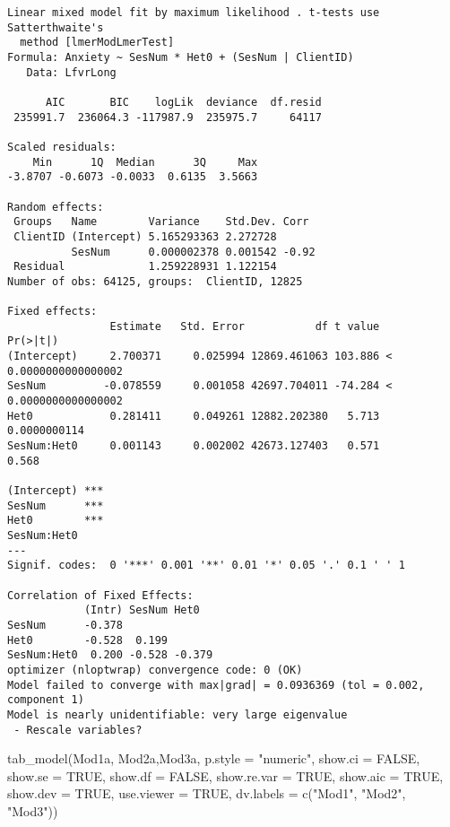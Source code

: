\documentclass[
  11pt,
]{book}
\newenvironment{Shaded}{\begin{snugshade}}{\end{snugshade}}
\newcommand{\AttributeTok}[1]{\textcolor[rgb]{0.77,0.63,0.00}{#1}}
\newcommand{\ConstantTok}[1]{\textcolor[rgb]{0.00,0.00,0.00}{#1}}
\newcommand{\FunctionTok}[1]{\textcolor[rgb]{0.00,0.00,0.00}{#1}}
\newcommand{\NormalTok}[1]{#1}
\newcommand{\StringTok}[1]{\textcolor[rgb]{0.31,0.60,0.02}{#1}}
\begin{document}
\begin{verbatim}
Linear mixed model fit by maximum likelihood . t-tests use Satterthwaite's
  method [lmerModLmerTest]
Formula: Anxiety ~ SesNum * Het0 + (SesNum | ClientID)
   Data: LfvrLong

      AIC       BIC    logLik  deviance  df.resid 
 235991.7  236064.3 -117987.9  235975.7     64117 

Scaled residuals: 
    Min      1Q  Median      3Q     Max 
-3.8707 -0.6073 -0.0033  0.6135  3.5663 

Random effects:
 Groups   Name        Variance    Std.Dev. Corr 
 ClientID (Intercept) 5.165293363 2.272728      
          SesNum      0.000002378 0.001542 -0.92
 Residual             1.259228931 1.122154      
Number of obs: 64125, groups:  ClientID, 12825

Fixed effects:
                Estimate   Std. Error           df t value             Pr(>|t|)
(Intercept)     2.700371     0.025994 12869.461063 103.886 < 0.0000000000000002
SesNum         -0.078559     0.001058 42697.704011 -74.284 < 0.0000000000000002
Het0            0.281411     0.049261 12882.202380   5.713         0.0000000114
SesNum:Het0     0.001143     0.002002 42673.127403   0.571                0.568
               
(Intercept) ***
SesNum      ***
Het0        ***
SesNum:Het0    
---
Signif. codes:  0 '***' 0.001 '**' 0.01 '*' 0.05 '.' 0.1 ' ' 1

Correlation of Fixed Effects:
            (Intr) SesNum Het0  
SesNum      -0.378              
Het0        -0.528  0.199       
SesNum:Het0  0.200 -0.528 -0.379
optimizer (nloptwrap) convergence code: 0 (OK)
Model failed to converge with max|grad| = 0.0936369 (tol = 0.002, component 1)
Model is nearly unidentifiable: very large eigenvalue
 - Rescale variables?
\end{verbatim}

\begin{Shaded}
\begin{Highlighting}[]
\FunctionTok{tab\_model}\NormalTok{(Mod1a, Mod2a,Mod3a, }\AttributeTok{p.style =} \StringTok{"numeric"}\NormalTok{, }\AttributeTok{show.ci =} \ConstantTok{FALSE}\NormalTok{, }\AttributeTok{show.se =} \ConstantTok{TRUE}\NormalTok{, }\AttributeTok{show.df =} \ConstantTok{FALSE}\NormalTok{, }\AttributeTok{show.re.var =} \ConstantTok{TRUE}\NormalTok{, }\AttributeTok{show.aic =} \ConstantTok{TRUE}\NormalTok{, }\AttributeTok{show.dev =} \ConstantTok{TRUE}\NormalTok{, }\AttributeTok{use.viewer =} \ConstantTok{TRUE}\NormalTok{, }\AttributeTok{dv.labels =} \FunctionTok{c}\NormalTok{(}\StringTok{"Mod1"}\NormalTok{, }\StringTok{"Mod2"}\NormalTok{, }\StringTok{"Mod3"}\NormalTok{))}
\end{Highlighting}
\end{Shaded}
\end{document}
